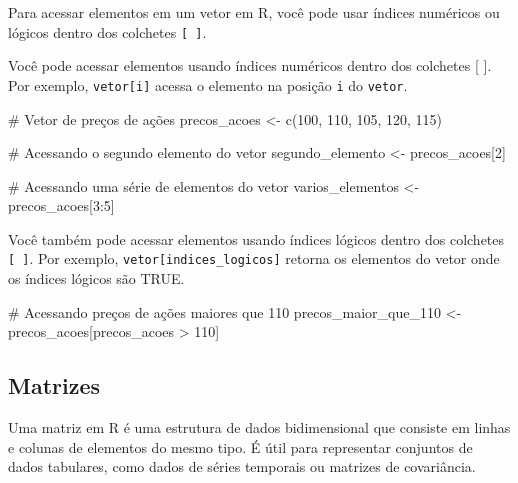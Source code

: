 \documentclass[
  letterpaper,
  DIV=11,
  numbers=noendperiod]{scrreprt}
\newenvironment{Shaded}{\begin{snugshade}}{\end{snugshade}}
\newcommand{\CommentTok}[1]{\textcolor[rgb]{0.37,0.37,0.37}{#1}}
\newcommand{\DecValTok}[1]{\textcolor[rgb]{0.68,0.00,0.00}{#1}}
\newcommand{\FunctionTok}[1]{\textcolor[rgb]{0.28,0.35,0.67}{#1}}
\newcommand{\NormalTok}[1]{\textcolor[rgb]{0.00,0.23,0.31}{#1}}
\newcommand{\OtherTok}[1]{\textcolor[rgb]{0.00,0.23,0.31}{#1}}
\newcommand{\SpecialCharTok}[1]{\textcolor[rgb]{0.37,0.37,0.37}{#1}}
\begin{document}
Para acessar elementos em um vetor em R, você pode usar índices
numéricos ou lógicos dentro dos colchetes \texttt{{[}\ {]}}.

Você pode acessar elementos usando índices numéricos dentro dos
colchetes {[} {]}. Por exemplo, \texttt{vetor{[}i{]}} acessa o elemento
na posição \texttt{i} do \texttt{vetor}.

\begin{Shaded}
\begin{Highlighting}[]
\CommentTok{\# Vetor de preços de ações}
\NormalTok{precos\_acoes }\OtherTok{\textless{}{-}} \FunctionTok{c}\NormalTok{(}\DecValTok{100}\NormalTok{, }\DecValTok{110}\NormalTok{, }\DecValTok{105}\NormalTok{, }\DecValTok{120}\NormalTok{, }\DecValTok{115}\NormalTok{)}

\CommentTok{\# Acessando o segundo elemento do vetor}
\NormalTok{segundo\_elemento }\OtherTok{\textless{}{-}}\NormalTok{ precos\_acoes[}\DecValTok{2}\NormalTok{]}

\CommentTok{\# Acessando uma série de elementos do vetor}
\NormalTok{varios\_elementos }\OtherTok{\textless{}{-}}\NormalTok{ precos\_acoes[}\DecValTok{3}\SpecialCharTok{:}\DecValTok{5}\NormalTok{]}
\end{Highlighting}
\end{Shaded}

Você também pode acessar elementos usando índices lógicos dentro dos
colchetes \texttt{{[}\ {]}}. Por exemplo,
\texttt{vetor{[}indices\_logicos{]}} retorna os elementos do vetor onde
os índices lógicos são TRUE.

\begin{Shaded}
\begin{Highlighting}[]
\CommentTok{\# Acessando preços de ações maiores que 110}
\NormalTok{precos\_maior\_que\_110 }\OtherTok{\textless{}{-}}\NormalTok{ precos\_acoes[precos\_acoes }\SpecialCharTok{\textgreater{}} \DecValTok{110}\NormalTok{]}
\end{Highlighting}
\end{Shaded}

\hypertarget{matrizes}{%
\subsection{Matrizes}\label{matrizes}}

Uma matriz em R é uma estrutura de dados bidimensional que consiste em
linhas e colunas de elementos do mesmo tipo. É útil para representar
conjuntos de dados tabulares, como dados de séries temporais ou matrizes
de covariância.
\end{document}
